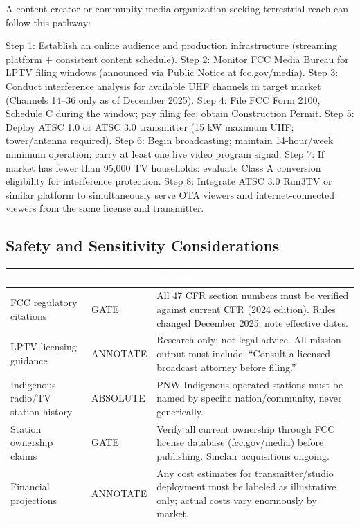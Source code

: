\documentclass[11pt,letterpaper]{article}
\newcommand{\tableheader}[1]{\textbf{\sffamily\textcolor{white}{#1}}}
\begin{document}
A content creator or community media organization seeking terrestrial reach can follow this pathway:

Step 1: Establish an online audience and production infrastructure (streaming platform + consistent content schedule). Step 2: Monitor FCC Media Bureau for LPTV filing windows (announced via Public Notice at fcc.gov/media). Step 3: Conduct interference analysis for available UHF channels in target market (Channels 14--36 only as of December 2025). Step 4: File FCC Form 2100, Schedule C during the window; pay filing fee; obtain Construction Permit. Step 5: Deploy ATSC 1.0 or ATSC 3.0 transmitter (15 kW maximum UHF; tower/antenna required). Step 6: Begin broadcasting; maintain 14-hour/week minimum operation; carry at least one live video program signal. Step 7: If market has fewer than 95,000 TV households: evaluate Class A conversion eligibility for interference protection. Step 8: Integrate ATSC 3.0 Run3TV or similar platform to simultaneously serve OTA viewers and internet-connected viewers from the same license and transmitter.

\subsection{Safety and Sensitivity Considerations}

\begin{center}
\begin{tabularx}{\textwidth}{L{4cm}L{2.5cm}X}
\toprule
{}
\tableheader{Area} & \tableheader{Type} & \tableheader{Handling} \\
\midrule
FCC regulatory citations & GATE & All 47 CFR section numbers must be verified against current CFR (2024 edition). Rules changed December 2025; note effective dates. \\
LPTV licensing guidance & ANNOTATE & Research only; not legal advice. All mission output must include: ``Consult a licensed broadcast attorney before filing.'' \\
Indigenous radio/TV station history & ABSOLUTE & PNW Indigenous-operated stations must be named by specific nation/community, never generically. \\
Station ownership claims & GATE & Verify all current ownership through FCC license database (fcc.gov/media) before publishing. Sinclair acquisitions ongoing. \\
Financial projections & ANNOTATE & Any cost estimates for transmitter/studio deployment must be labeled as illustrative only; actual costs vary enormously by market. \\
\bottomrule
\end{tabularx}
\end{center}
\end{document}
